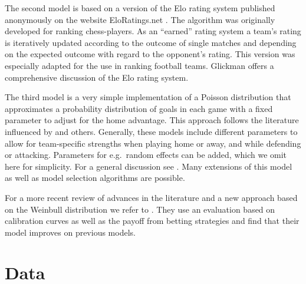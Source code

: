 \documentclass[12pt,a4paper]{article}
\begin{document}
The second model is based on a version of the Elo rating system
published anonymously on the website EloRatings.net
\autocite*{eloratings}. The algorithm was originally developed for
ranking chess-players. As an \enquote{earned} rating system
\textcite{lasek2013} a team's rating is iteratively updated according to
the outcome of single matches and depending on the expected outcome with
regard to the opponent's rating. This version was especially adapted for
the use in ranking football teams. Glickman \autocite*{glickman1995}
offers a comprehensive discussion of the Elo rating system.

The third model is a very simple implementation of a Poisson
distribution that approximates a probability distribution of goals in
each game with a fixed parameter to adjust for the home advantage. This
approach follows the literature influenced by \textcite{maher1982} and
others. Generally, these models include different parameters to allow
for team-specific strengths when playing home or away, and while
defending or attacking. Parameters for e.g.~random effects can be added,
which we omit here for simplicity. For a general discussion see
\textcite{karlis2003}. Many extensions of this model as well as model
selection algorithms are possible.

For a more recent review of advances in the literature and a new
approach based on the Weinbull distribution we refer to
\textcite{boshnakov2017}. They use an evaluation based on calibration
curves as well as the payoff from betting strategies and find that their
model improves on previous models.

\hypertarget{data}{%
\section{Data}\label{data}}
\end{document}
